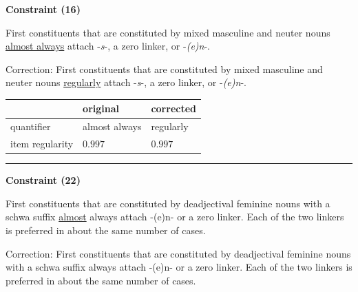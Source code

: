 \vspace{0.6em}

\begin{center}
\textbf{Constraint (16)}
\end{center}

\noindent
First constituents that are constituted by mixed masculine and neuter nouns \underline{almost always} attach -\textit{s}-, a zero linker, or -\textit{(e)n}-.
\vspace{0.3em}

\noindent
Correction: First constituents that are constituted by mixed masculine and neuter nouns \underline{regularly} attach -\textit{s}-, a zero linker, or -\textit{(e)n}-.

\vspace{-0.25em}

\begin{table}[!ht]

\begin{center}

\begin{tabularx}{\columnwidth}{|X|X|X|}
      \hline
                        & original      & corrected \\
      \hline
      quantifier        & almost always      & regularly   \\
      \hline
      item regularity   & $0.997$      & $0.997$   \\
      \hline
\end{tabularx}
\end{center}
\end{table}

\vspace{-0.75em}
\hrule




\vspace{0.6em}

\begin{center}
\textbf{Constraint (22)}
\end{center}

\noindent
First constituents that are constituted by deadjectival feminine nouns with a schwa suffix \underline{almost} always attach -(e)n- or a zero linker. Each of the two linkers is preferred in about the same number of cases.
\vspace{0.3em}

\newpage

\noindent
Correction: First constituents that are constituted by deadjectival feminine nouns with a schwa suffix always attach -(e)n- or a zero linker. Each of the two linkers is preferred in about the same number of cases.

